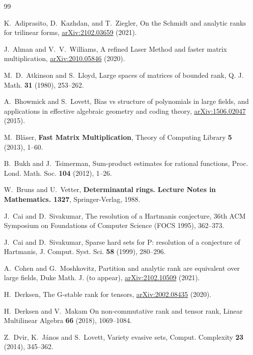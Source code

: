 \begin{thebibliography}{99}

K.~Adiprasito, D.~Kazhdan, and T.~Ziegler,
{On the Schmidt and analytic ranks for trilinear forms},
\href{https://arxiv.org/abs/2102.03659}{arXiv:2102.03659} (2021).

J.~Alman and V.~V.~Williams, 
{A refined Laser Method and faster matrix multiplication},
\href{https://arxiv.org/abs/2010.05846}{arXiv:2010.05846} (2020).

M.~D.~Atkinson and S.~Lloyd, 
{Large spaces of matrices of bounded rank}, 
{Q. J. Math.} \textbf{31} (1980), 253--262.

A.~Bhowmick and S.~Lovett, 
{Bias vs structure of polynomials in large fields, and applications in
	effective algebraic geometry and coding theory},
\href{https://arxiv.org/abs/arXiv:1506.02047}{arXiv:1506.02047} (2015).

M.~Bl{\"a}ser,
{\bf Fast Matrix Multiplication}, 
{Theory of Computing Library} \textbf{5} (2013), 1--60.

B.~Bukh and J.~Tsimerman,
{Sum-product estimates for rational functions},
{Proc. Lond. Math. Soc.} \textbf{104} (2012), 1--26.

W.~Bruns and U.~Vetter, 
{\bf Determinantal rings. Lecture Notes in Mathematics. 1327}, 
Springer-Verlag, 1988.

J.~Cai and D.~Sivakumar,
{The resolution of a Hartmanis conjecture}, 
{36th ACM Symposium on Foundations of Computer Science (FOCS 1995)}, 362--373.

J.~Cai and D.~Sivakumar,
{Sparse hard sets for P: resolution of a conjecture of Hartmanis}, 
{J. Comput. Syst. Sci.} \textbf{58} (1999), 280--296.

A.~Cohen and G.~Moshkovitz,
{Partition and analytic rank are equivalent over large fields},
Duke Math. J. (to appear),
\href{https://arxiv.org/abs/2102.10509}{arXiv:2102.10509} (2021).

H.~Derksen,
{The G-stable rank for tensors},
\href{https://arxiv.org/abs/2002.08435}{arXiv:2002.08435} (2020).

H.~Derksen and V.~Makam
{On non-commutative rank and tensor rank},
{Linear Multilinear Algebra} \textbf{66} (2018), 1069--1084.

Z.~Dvir, K.~J\'{a}nos and S.~Lovett,
{Variety evasive sets},
{Comput. Complexity} \textbf{23} (2014), 345--362.


\end{thebibliography}
